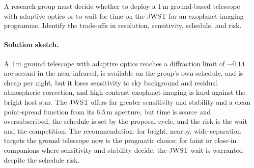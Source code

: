 \begin{exercise}
A research group must decide whether to deploy a $1\,\si{\meter}$
ground-based telescope with adaptive optics or to wait for time on
the JWST for an exoplanet-imaging programme. Identify the trade-offs
in resolution, sensitivity, schedule, and risk.
\paragraph{Solution sketch.} A $1\,\si{\meter}$ ground telescope with
adaptive optics reaches a diffraction limit of
$\sim 0.14$ arc-second in the near-infrared, is available on the group's
own schedule, and is cheap per night, but it loses sensitivity to sky
background and residual atmospheric correction, and high-contrast
exoplanet imaging is hard against the bright host star. The JWST offers
far greater sensitivity and stability and a clean point-spread function
from its $6.5\,\si{\meter}$ aperture, but time is scarce and
oversubscribed, the schedule is set by the proposal cycle, and the risk
is the wait and the competition. The recommendation: for bright,
nearby, wide-separation targets the ground telescope now is the
pragmatic choice; for faint or close-in companions where sensitivity and
stability decide, the JWST wait is warranted despite the schedule risk.
\end{exercise}
